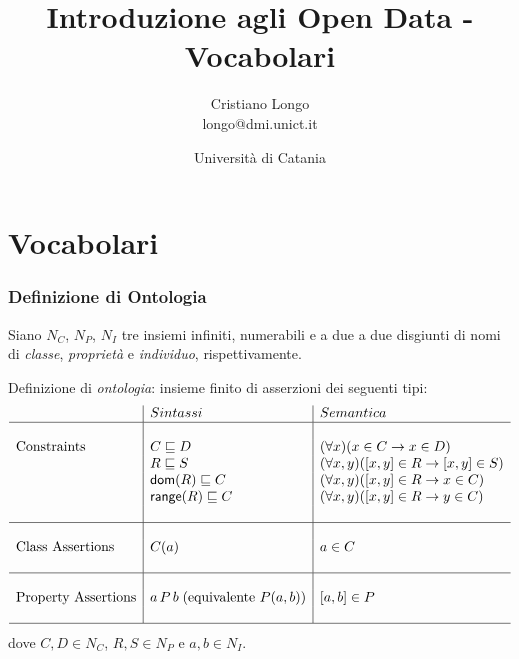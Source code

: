 \documentclass[8pt]{beamer}
\title{Introduzione agli Open Data - Vocabolari}
\author{Cristiano Longo\\ 
{\small{longo@dmi.unict.it}}}
\date{Universit\`a di Catania}
\newcommand{\CNames}{N_C}
\newcommand{\PNames}{N_P}
\newcommand{\INames}{N_I}
\begin{document}
\maketitle
\setcounter{tocdepth}{1}

\section{Vocabolari}


\begin{frame}
\frametitle{Definizione di Ontologia}

Siano $\CNames$, $\PNames$, $\INames$ tre insiemi infiniti, numerabili e 
a due a due disgiunti di nomi di \emph{classe}, \emph{propriet\`a} e \emph{individuo},
rispettivamente.
\vspace{\baselineskip}


Definizione di \emph{ontologia}: insieme finito di asserzioni dei seguenti tipi:
\[
 \begin{array}{l|l|l}
  & Sintassi & Semantica \\
  \hline
  &&\\
  \mbox{Constraints} & C \sqsubseteq D & (\forall x)(x \in C \rightarrow x \in D) \\
  & R \sqsubseteq S & (\forall x, y)([x, y] \in R \rightarrow [x,y] \in S) \\
  & \mathsf{dom}(R) \sqsubseteq C & (\forall x, y)([x, y] \in R \rightarrow x \in C) \\
  & \mathsf{range}(R) \sqsubseteq C & (\forall x, y)([x, y] \in R \rightarrow y \in C) \\
  &&\\
  \hline
  &&\\
  \mbox{Class Assertions} & C(a) & a \in C\\
  &&\\
  \hline
  &&\\
  \mbox{Property Assertions} & a\,P\,b\;(\mbox{equivalente }P(a,b)) & [a,b] \in P \\
  &&\\
  \hline  
 \end{array}
\]
dove $C, D \in \CNames$, $R, S \in \PNames$ e $a, b \in \INames$.
\end{frame}
\end{document}
